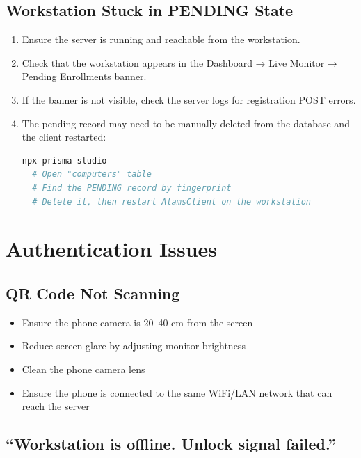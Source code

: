 \subsection{Workstation Stuck in PENDING State}

\begin{enumerate}[leftmargin=*, label=\textbf{\arabic*.}]
  \item Ensure the server is running and reachable from the workstation.
  \item Check that the workstation appears in the Dashboard → Live Monitor → Pending Enrollments banner.
  \item If the banner is not visible, check the server logs for registration POST errors.
  \item The pending record may need to be manually deleted from the database and the client restarted:
  \begin{tcolorbox}[codebox, title={Reset Stuck Registration (Prisma Studio)}]
  \begin{lstlisting}[language=bash]
  npx prisma studio
  # Open "computers" table
  # Find the PENDING record by fingerprint
  # Delete it, then restart AlamsClient on the workstation
  \end{lstlisting}
  \end{tcolorbox}
\end{enumerate}

\section{Authentication Issues}

\subsection{QR Code Not Scanning}

\begin{itemize}[label={--}]
  \item Ensure the phone camera is 20–40 cm from the screen
  \item Reduce screen glare by adjusting monitor brightness
  \item Clean the phone camera lens
  \item Ensure the phone is connected to the same WiFi/LAN network that can reach the server
\end{itemize}

\subsection{``Workstation is offline. Unlock signal failed.''}

